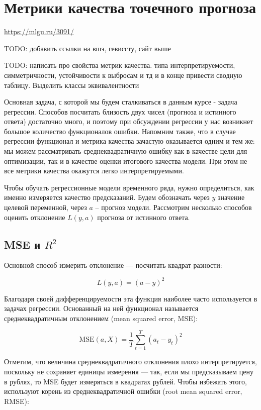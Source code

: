 \section{Метрики качества точечного прогноза}

\url{https://mlgu.ru/3091/}

TODO: добавить ссылки на вшэ, гевиссту, сайт выше

TODO: написать про свойства метрик качества. типа интерпретируемости,
симметричности, устойчивости к выбросам и тд и в конце привести
сводную таблицу. Выделить классы эквивалентности

Основная задача, с которой мы будем сталкиваться в данным курсе -
задача регрессии. Способов посчитать близость двух чисел
(прогноза и истинного ответа) достаточно много, и поэтому при
обсуждении регрессии у нас возникнет большое количество функционалов ошибки.
Напомним также, что в случае регрессии функционал и метрика качества
зачастую оказывается одним и тем же: мы можем рассматривать
среднеквадратичную ошибку как в качестве цели для оптимизации, так
и в качестве оценки итогового качества модели. При этом не все
метрики качества окажутся легко интерпретируемыми.

Чтобы обучать регрессионные модели временного ряда, нужно
определиться, как именно измеряется качество предсказаний. Будем
обозначать через \( y \) значение целевой переменной, через \( a \) --
прогноз модели.
Рассмотрим несколько способов оценить отклонение \( L(y, a) \)
прогноза от истинного ответа.

\subsection*{MSE и \( R^2 \)}
Основной способ измерить отклонение — посчитать квадрат разности:

\[ L(y, a) = (a - y)^2 \]

Благодаря своей дифференцируемости эта функция наиболее часто
используется в задачах регрессии. Основанный на ней функционал
называется среднеквадратичным отклонением (mean squared error, MSE):

\[ \text{MSE}(a, X) = \frac{1}{T} \sum_{t=1}^{T} (a_t - y_t)^2 \]

Отметим, что величина среднеквадратичного отклонения плохо
интерпретируется, поскольку не сохраняет единицы измерения — так,
если мы предсказываем цену в рублях, то MSE будет измеряться в
квадратах рублей. Чтобы избежать этого, используют корень из
среднеквадратичной ошибки (root mean squared error, RMSE):

